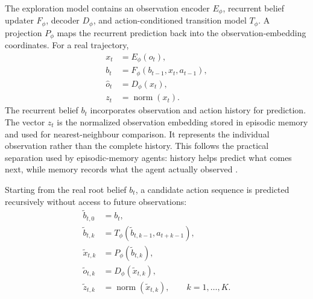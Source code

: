 \documentclass{article}
\begin{document}
The exploration model contains an observation encoder $E_\phi$, recurrent
belief updater $F_\phi$, decoder $D_\phi$, and action-conditioned transition
model $T_\phi$. A projection $P_\phi$ maps the recurrent prediction back into
the observation-embedding coordinates. For a real trajectory,
\begin{align}
    x_t &= E_\phi(o_t), \\
    b_t &= F_\phi(b_{t-1},x_t,a_{t-1}), \\
    \hat{o}_t &= D_\phi(x_t), \\
    z_t &= \operatorname{norm}(x_t).
\end{align}
The recurrent belief $b_t$ incorporates observation and action history for
prediction. The vector $z_t$ is the normalized observation embedding stored in
episodic memory and used for nearest-neighbour comparison. It represents the
individual observation rather than the complete history. This follows the
practical separation used by episodic-memory agents: history helps predict what
comes next, while memory records what the agent actually observed
\citep{ngu}.

Starting from the real root belief $b_t$, a candidate action sequence is
predicted recursively without access to future observations:
\begin{align}
    \tilde b_{t,0} &= b_t, \\
    \tilde b_{t,k}
        &=T_\phi(\tilde b_{t,k-1},a_{t+k-1}), \\
    \tilde x_{t,k} &=P_\phi(\tilde b_{t,k}), \\
    \tilde o_{t,k} &=D_\phi(\tilde x_{t,k}), \\
    \tilde z_{t,k}
        &=\operatorname{norm}(\tilde x_{t,k}),
        \qquad k=1,\ldots,K.
\end{align}
\end{document}
